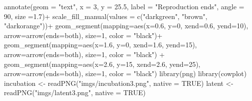 \documentclass[
  letterpaper,
  DIV=11,
  numbers=noendperiod]{scrreprt}
\newenvironment{Shaded}{\begin{snugshade}}{\end{snugshade}}
\newcommand{\AttributeTok}[1]{\textcolor[rgb]{0.40,0.45,0.13}{#1}}
\newcommand{\ConstantTok}[1]{\textcolor[rgb]{0.56,0.35,0.01}{#1}}
\newcommand{\DecValTok}[1]{\textcolor[rgb]{0.68,0.00,0.00}{#1}}
\newcommand{\FloatTok}[1]{\textcolor[rgb]{0.68,0.00,0.00}{#1}}
\newcommand{\FunctionTok}[1]{\textcolor[rgb]{0.28,0.35,0.67}{#1}}
\newcommand{\NormalTok}[1]{\textcolor[rgb]{0.00,0.23,0.31}{#1}}
\newcommand{\OtherTok}[1]{\textcolor[rgb]{0.00,0.23,0.31}{#1}}
\newcommand{\SpecialCharTok}[1]{\textcolor[rgb]{0.37,0.37,0.37}{#1}}
\newcommand{\StringTok}[1]{\textcolor[rgb]{0.13,0.47,0.30}{#1}}
\begin{document}
\begin{Shaded}
\begin{Highlighting}[]
  \FunctionTok{annotate}\NormalTok{(}\AttributeTok{geom =} \StringTok{"text"}\NormalTok{, }\AttributeTok{x =} \DecValTok{3}\NormalTok{, }\AttributeTok{y =} \FloatTok{25.5}\NormalTok{, }\AttributeTok{label =} \StringTok{"Reproduction ends"}\NormalTok{, }\AttributeTok{angle =} \DecValTok{90}\NormalTok{, }\AttributeTok{size =}\FloatTok{1.7}\NormalTok{)}\SpecialCharTok{+}
  \FunctionTok{scale\_fill\_manual}\NormalTok{(}\AttributeTok{values =} \FunctionTok{c}\NormalTok{(}\StringTok{"darkgreen"}\NormalTok{,  }\StringTok{"brown"}\NormalTok{, }\StringTok{"darkorange"}\NormalTok{))}\SpecialCharTok{+}
  \FunctionTok{geom\_segment}\NormalTok{(}\AttributeTok{mapping=}\FunctionTok{aes}\NormalTok{(}\AttributeTok{x=}\FloatTok{0.6}\NormalTok{, }\AttributeTok{y=}\DecValTok{0}\NormalTok{, }\AttributeTok{xend=}\FloatTok{0.6}\NormalTok{, }\AttributeTok{yend=}\DecValTok{10}\NormalTok{), }\AttributeTok{arrow=}\FunctionTok{arrow}\NormalTok{(}\AttributeTok{ends=}\StringTok{\textquotesingle{}both\textquotesingle{}}\NormalTok{), }\AttributeTok{size=}\DecValTok{1}\NormalTok{, }\AttributeTok{color =} \StringTok{"black"}\NormalTok{)}\SpecialCharTok{+} 
  \FunctionTok{geom\_segment}\NormalTok{(}\AttributeTok{mapping=}\FunctionTok{aes}\NormalTok{(}\AttributeTok{x=}\FloatTok{1.6}\NormalTok{, }\AttributeTok{y=}\DecValTok{0}\NormalTok{, }\AttributeTok{xend=}\FloatTok{1.6}\NormalTok{, }\AttributeTok{yend=}\DecValTok{15}\NormalTok{), }\AttributeTok{arrow=}\FunctionTok{arrow}\NormalTok{(}\AttributeTok{ends=}\StringTok{\textquotesingle{}both\textquotesingle{}}\NormalTok{), }\AttributeTok{size=}\DecValTok{1}\NormalTok{, }\AttributeTok{color =} \StringTok{"black"}\NormalTok{)  }\SpecialCharTok{+}
   \FunctionTok{geom\_segment}\NormalTok{(}\AttributeTok{mapping=}\FunctionTok{aes}\NormalTok{(}\AttributeTok{x=}\FloatTok{2.6}\NormalTok{, }\AttributeTok{y=}\DecValTok{15}\NormalTok{, }\AttributeTok{xend=}\FloatTok{2.6}\NormalTok{, }\AttributeTok{yend=}\DecValTok{25}\NormalTok{), }\AttributeTok{arrow=}\FunctionTok{arrow}\NormalTok{(}\AttributeTok{ends=}\StringTok{\textquotesingle{}both\textquotesingle{}}\NormalTok{), }\AttributeTok{size=}\DecValTok{1}\NormalTok{, }\AttributeTok{color =} \StringTok{"black"}\NormalTok{) }
  \FunctionTok{library}\NormalTok{(png)}
  \FunctionTok{library}\NormalTok{(cowplot)}
\NormalTok{  incubation }\OtherTok{\textless{}{-}} \FunctionTok{readPNG}\NormalTok{(}\StringTok{"imgs/incubation3.png"}\NormalTok{, }\AttributeTok{native =} \ConstantTok{TRUE}\NormalTok{)}
\NormalTok{  latent }\OtherTok{\textless{}{-}} \FunctionTok{readPNG}\NormalTok{(}\StringTok{"imgs/latent3.png"}\NormalTok{, }\AttributeTok{native =} \ConstantTok{TRUE}\NormalTok{)}

\end{Highlighting}
\end{Shaded}
\end{document}
